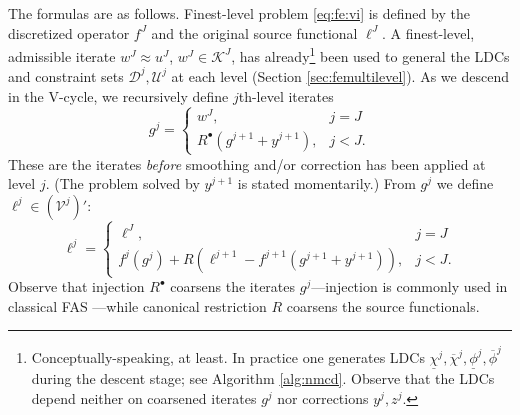 \documentclass[letterpaper,final,12pt,reqno]{amsart}
\theoremstyle{cstyle}
\theoremstyle{cstyle*}
\theoremstyle{dstyle}
\numberwithin{equation}{section}
\numberwithin{figure}{section}
\numberwithin{table}{section}
\numberwithin{theorem}{section}
\newcommand{\cV}{\mathcal{V}}
\newcommand{\iR}{R^{\bullet}}
\begin{document}
The formulas are as follows.  Finest-level problem \eqref{eq:fe:vi} is defined by the discretized operator $f^J$ and the original source functional $\ell^J$.  A finest-level, admissible iterate $w^J \approx u^J$, $w^J \in \mathcal{K}^J$, has already\footnote{Conceptually-speaking, at least.  In practice one generates LDCs $\underline{\chi}^j,\overline{\chi}^j,\underline{\phi}^j,\overline{\phi}^j$ during the descent stage; see Algorithm \ref{alg:nmcd}.  Observe that the LDCs depend neither on coarsened iterates $g^j$ nor corrections $y^j,z^j$.} been used to general the LDCs and constraint sets $\mathcal{D}^j,\mathcal{U}^j$ at each level (Section \ref{sec:femultilevel}).  As we descend in the V-cycle, we recursively define $j$th-level iterates
\begin{equation}
g^j = \begin{cases} w^J, & j=J \\
                    \iR(g^{j+1} + y^{j+1}), & j < J.
      \end{cases}  \label{eq:fe:defineg}
\end{equation}
These are the iterates \emph{before} smoothing and/or correction has been applied at level $j$.  (The problem solved by $y^{j+1}$ is stated momentarily.)  From $g^j$ we define $\ell^j \in (\cV^j)'$:
\begin{equation}
\ell^j = \begin{cases} \ell^J, & j=J \\
                       f^j(g^j) + R\left(\ell^{j+1}-f^{j+1}(g^{j+1}+y^{j+1})\right), & j<J. \end{cases} \label{eq:fe:levelsource}
\end{equation}
Observe that injection $\iR$ coarsens the iterates $g^j$---injection is commonly used in classical FAS \cite[section 5.3]{Trottenbergetal2001}---while canonical restriction $R$ coarsens the source functionals.
\end{document}
